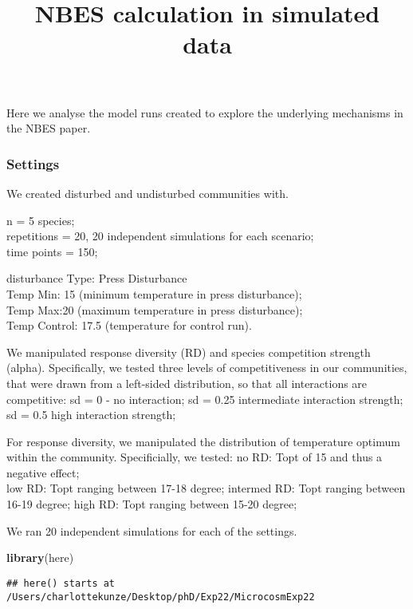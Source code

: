 \documentclass[
]{article}
\title{NBES calculation in simulated data}
\author{}
\date{\vspace{-2.5em}}
\newenvironment{Shaded}{\begin{snugshade}}{\end{snugshade}}
\newcommand{\FunctionTok}[1]{\textcolor[rgb]{0.13,0.29,0.53}{\textbf{#1}}}
\newcommand{\NormalTok}[1]{#1}
\begin{document}
\maketitle

Here we analyse the model runs created to explore the underlying
mechanisms in the NBES paper.

\subsubsection{Settings}\label{settings}

We created disturbed and undisturbed communities with.

n = 5 species;\\
repetitions = 20, 20 independent simulations for each scenario;\\
time points = 150;

disturbance Type: Press Disturbance\\
Temp Min: 15 (minimum temperature in press disturbance);\\
Temp Max:20 (maximum temperature in press disturbance);\\
Temp Control: 17.5 (temperature for control run).

We manipulated response diversity (RD) and species competition strength
(alpha). Specifically, we tested three levels of competitiveness in our
communities, that were drawn from a left-sided distribution, so that all
interactions are competitive: sd = 0 - no interaction; sd = 0.25
intermediate interaction strength; sd = 0.5 high interaction strength;

For response diversity, we manipulated the distribution of temperature
optimum within the community. Specificially, we tested: no RD: Topt of
15 and thus a negative effect;\\
low RD: Topt ranging between 17-18 degree; intermed RD: Topt ranging
between 16-19 degree; high RD: Topt ranging between 15-20 degree;

We ran 20 independent simulations for each of the settings.

\begin{Shaded}
\begin{Highlighting}[]
\FunctionTok{library}\NormalTok{(here)}
\end{Highlighting}
\end{Shaded}

\begin{verbatim}
## here() starts at /Users/charlottekunze/Desktop/phD/Exp22/MicrocosmExp22
\end{verbatim}
\end{document}
